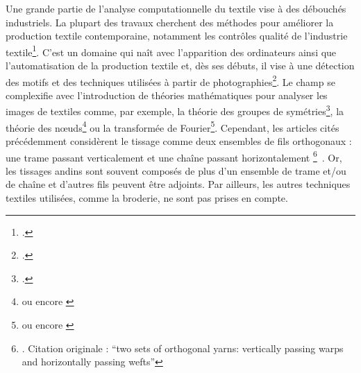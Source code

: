 Une grande partie de l'analyse computationnelle du textile vise à des débouchés industriels. La plupart des travaux cherchent des méthodes pour améliorer la production textile contemporaine, notamment les contrôles qualité de l'industrie textile\footcite[p.~6346]{mengAutomaticRecognitionWoven2022}. C'est un domaine qui naît avec l'apparition des ordinateurs ainsi que l'automatisation de la production textile et, dès ses débuts, il vise à une détection des motifs et des techniques utilisées à partir de photographies\footcite{kangAutomaticRecognitionFabric1999}. Le champ se complexifie avec l'introduction de théories mathématiques pour analyser les images de textiles comme, par exemple, la théorie des groupes de symétries\footcite{valienteStructuralDescriptionTextile2004}, la théorie des n\oe{}uds\footnote{\cite{grishanovTopologicalStudyTextile2009} ou encore \cite{helmerSimilarityMeasureWeaving2018}} ou la transformée de Fourier\footnote{\cite{zhengAccurateIndexingClassification2009} ou encore \cite{zhangWeavePatternRecognition2017}}. Cependant, les articles cités précédemment considèrent le tissage comme  \og deux ensembles de fils orthogonaux : une trame passant verticalement et une chaîne passant horizontalement \footnote{\cite[p.~6345]{mengAutomaticRecognitionWoven2022}. Citation originale :  \textquotedblleft two sets of orthogonal yarns: vertically passing warps and horizontally passing wefts\textquotedblright}~\fg. Or, les tissages andins sont souvent composés de plus d'un ensemble de trame et/ou de chaîne et d'autres fils peuvent être adjoints. Par ailleurs, les autres techniques textiles utilisées, comme la broderie, ne sont pas prises en compte. 

